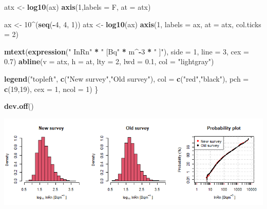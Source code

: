 \documentclass[
  12pt,
]{article}
\newenvironment{Shaded}{\begin{snugshade}}{\end{snugshade}}
\newcommand{\DataTypeTok}[1]{\textcolor[rgb]{0.13,0.29,0.53}{#1}}
\newcommand{\DecValTok}[1]{\textcolor[rgb]{0.00,0.00,0.81}{#1}}
\newcommand{\FloatTok}[1]{\textcolor[rgb]{0.00,0.00,0.81}{#1}}
\newcommand{\KeywordTok}[1]{\textcolor[rgb]{0.13,0.29,0.53}{\textbf{#1}}}
\newcommand{\NormalTok}[1]{#1}
\newcommand{\OperatorTok}[1]{\textcolor[rgb]{0.81,0.36,0.00}{\textbf{#1}}}
\newcommand{\StringTok}[1]{\textcolor[rgb]{0.31,0.60,0.02}{#1}}
\begin{document}
\begin{Shaded}
\begin{Highlighting}[]
\NormalTok{     atx \textless{}{-}}\StringTok{ }\KeywordTok{log10}\NormalTok{(ax)}
     \KeywordTok{axis}\NormalTok{(}\DecValTok{1}\NormalTok{,}\DataTypeTok{labels =}\NormalTok{ F, }\DataTypeTok{at =}\NormalTok{ atx)}
     
\NormalTok{     ax \textless{}{-}}\StringTok{ }\DecValTok{10}\OperatorTok{\^{}}\NormalTok{(}\KeywordTok{seq}\NormalTok{(}\OperatorTok{{-}}\DecValTok{4}\NormalTok{, }\DecValTok{4}\NormalTok{, }\DecValTok{1}\NormalTok{))}
\NormalTok{     atx \textless{}{-}}\StringTok{ }\KeywordTok{log10}\NormalTok{(ax)}
     \KeywordTok{axis}\NormalTok{(}\DecValTok{1}\NormalTok{, }\DataTypeTok{labels =}\NormalTok{ ax, }\DataTypeTok{at =}\NormalTok{ atx, }\DataTypeTok{col.ticks =} \DecValTok{2}\NormalTok{)}
      
     \KeywordTok{mtext}\NormalTok{(}\KeywordTok{expression}\NormalTok{(}\StringTok{" InRn"} \OperatorTok{*}\StringTok{  " [Bq"} \OperatorTok{*}\StringTok{ }\NormalTok{m}\OperatorTok{\^{}{-}}\DecValTok{3} \OperatorTok{*}\StringTok{ " ]"}\NormalTok{),}
           \DataTypeTok{side =} \DecValTok{1}\NormalTok{,}
           \DataTypeTok{line =} \DecValTok{3}\NormalTok{,}
           \DataTypeTok{cex =} \FloatTok{0.7}\NormalTok{)}
     \KeywordTok{abline}\NormalTok{(}\DataTypeTok{v =}\NormalTok{ atx, }\DataTypeTok{h =}\NormalTok{ at, }\DataTypeTok{lty =} \DecValTok{2}\NormalTok{, }\DataTypeTok{lwd =} \FloatTok{0.1}\NormalTok{, }\DataTypeTok{col =} \StringTok{"lightgray"}\NormalTok{)}
      
     \KeywordTok{legend}\NormalTok{(}\StringTok{"topleft"}\NormalTok{,}
            \KeywordTok{c}\NormalTok{(}\StringTok{"New survey"}\NormalTok{,}\StringTok{"Old survey"}\NormalTok{),}
            \DataTypeTok{col =} \KeywordTok{c}\NormalTok{(}\StringTok{"red"}\NormalTok{,}\StringTok{"black"}\NormalTok{),}
            \DataTypeTok{pch =} \KeywordTok{c}\NormalTok{(}\DecValTok{19}\NormalTok{,}\DecValTok{19}\NormalTok{),}
            \DataTypeTok{cex =} \DecValTok{1}\NormalTok{,}
            \DataTypeTok{ncol =} \DecValTok{1}\NormalTok{)}
\NormalTok{     \}}
  
  \KeywordTok{dev.off}\NormalTok{()}
\end{Highlighting}
\end{Shaded}

\begin{center}\includegraphics[width=1\linewidth]{Rresults/Figure_7} \end{center}
\end{document}
